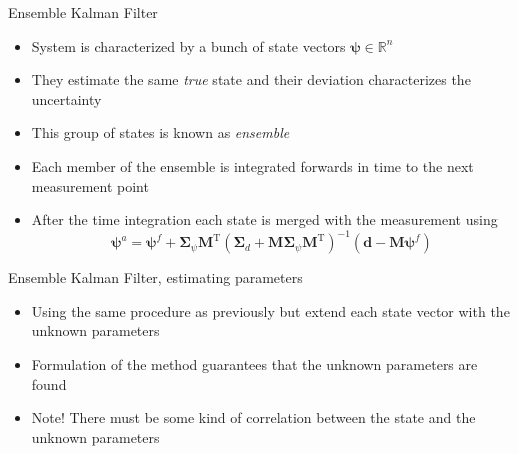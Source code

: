 \documentclass{beamer}
\begin{document}
\begin{frame}{Ensemble Kalman Filter}

\begin{itemize}
\item System is characterized by a bunch of state vectors $\boldsymbol{\psi} \in \mathbb{R}^n$
\item They estimate the same \emph{true} state and their deviation characterizes the uncertainty
\item This group of states is known as \emph{ensemble} 
\item Each member of the ensemble is integrated forwards in time to the next measurement point
\item After the time integration each state is merged with the measurement using
\[
\boldsymbol{\psi}^a = \boldsymbol{\psi}^f + \boldsymbol{\Sigma}_\psi \mathbf{M}^\mathrm{T} \left(\boldsymbol{\Sigma}_d+\mathbf{M}\boldsymbol{\Sigma}_\psi\mathbf{M}^\mathrm{T}\right)^{-1}\left(\boldsymbol{d}-\mathbf{M}\boldsymbol{\psi}^f\right)
\]
\end{itemize}

\end{frame}

\begin{frame}{Ensemble Kalman Filter, estimating parameters}

\begin{itemize}
\item Using the same procedure as previously but extend each state vector with the unknown parameters
\item Formulation of the method guarantees that the unknown parameters are found
\item Note! There must be some kind of correlation between the state and the unknown parameters
\end{itemize}

\end{frame}
\end{document}
